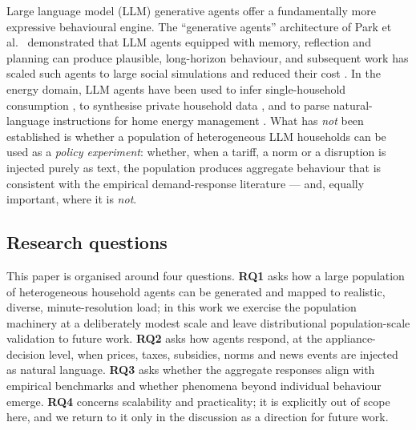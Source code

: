 \documentclass[11pt]{article}
\begin{document}
Large language model (LLM) generative agents offer a fundamentally more expressive behavioural engine.
The ``generative agents'' architecture of Park et al.\ \cite{park2023} demonstrated that LLM agents
equipped with memory, reflection and planning can produce plausible, long-horizon behaviour, and
subsequent work has scaled such agents to large social simulations \cite{piao2025} and reduced their cost
\cite{koley2025}. In the energy domain, LLM agents have been used to infer single-household consumption
\cite{chetty2025}, to synthesise private household data \cite{almashor2024}, and to parse natural-language
instructions for home energy management \cite{michelon2025}. What has \emph{not} been established is
whether a population of heterogeneous LLM households can be used as a \emph{policy experiment}: whether,
when a tariff, a norm or a disruption is injected purely as text, the population produces aggregate
behaviour that is consistent with the empirical demand-response literature --- and, equally important,
where it is \emph{not}.

\subsection{Research questions}
This paper is organised around four questions. \textbf{RQ1} asks how a large population of heterogeneous
household agents can be generated and mapped to realistic, diverse, minute-resolution load; in this work
we exercise the population machinery at a deliberately modest scale and leave distributional
population-scale validation to future work. \textbf{RQ2} asks how agents respond, at the
appliance-decision level, when prices, taxes, subsidies, norms and news events are injected as natural
language. \textbf{RQ3} asks whether the aggregate responses align with empirical benchmarks and whether
phenomena beyond individual behaviour emerge. \textbf{RQ4} concerns scalability and practicality; it is
explicitly out of scope here, and we return to it only in the discussion as a direction for future work.
\end{document}
